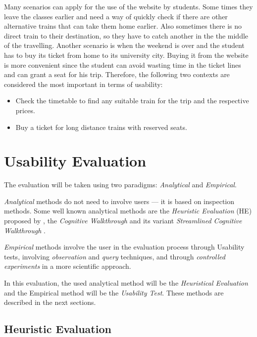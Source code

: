 \documentclass[a4paper]{article}
\begin{document}
Many scenarios can apply for the use of the website by students. Some times they leave the classes earlier and need a way of quickly check if there are other alternative trains that can take them home earlier. Also sometimes there is no direct train to their destination, so they have to catch another in the the middle of the travelling. Another scenario is when the weekend is over and the student has to buy its ticket from home to its university city. Buying it from the website is more convenient since the student can avoid wasting time in the ticket lines and can grant a seat for his trip. Therefore, the following two contexts are considered the most important in terms of usability:

\begin{itemize}
  \item Check the timetable to find any suitable train for the trip and the respective prices.
  \item Buy a ticket for long distance trains with reserved seats.
\end{itemize}

\section{Usability Evaluation}

The evaluation will be taken using two paradigms: \emph{Analytical} and \emph{Empirical}.

\emph{Analytical} methods do not need to involve users --- it is based on inspection methods. Some well known analytical methods are the \emph{Heuristic Evaluation} (HE) proposed by \citet{nielsen1990heuristic}, the \emph{Cognitive Walkthrough} \citep{wharton1994cognitive} and its variant \emph{Streamlined Cognitive Walkthrough} \citep{spencer2000streamlined}.

\emph{Empirical} methods involve the user in the evaluation process through Usability tests, involving \emph{observation} and \emph{query} techniques, and through \emph{controlled experiments} in a more scientific approach. 

In this evaluation, the used analytical method will be the  \emph{Heuristical Evaluation} and the Empirical method will be the \emph{Usability Test}. These methods are described in the next sections.

\subsection{Heuristic Evaluation}
\end{document}
